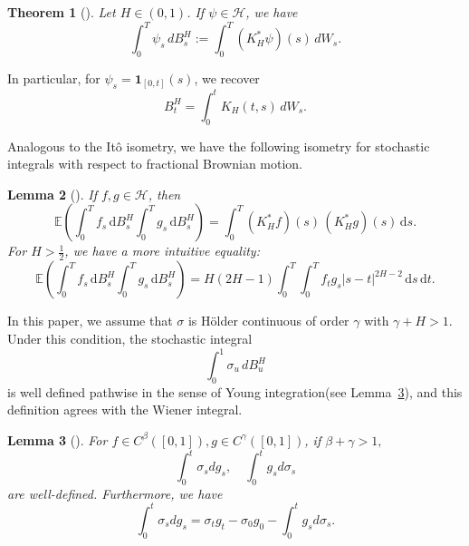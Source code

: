 \documentclass[preprint,12pt]{elsarticle}
\newtheorem{theorem}{Theorem}[section]
\newtheorem{lemma}[theorem]{Lemma}
\theoremstyle{definition}  %
\theoremstyle{plain}  %
\begin{document}
\begin{theorem}[\cite{Biagini2008}]
Let $H\in(0,1)$. 
If $\psi\in\mathcal{H}$, we have
\begin{equation*}
  \int_0^T \psi_s\,dB^H_s 
  := \int_0^T (K_H^*\psi)(s)\,dW_s.
\end{equation*}
\end{theorem}
In particular, for $\psi_s=\mathbf{1}_{[0,t]}(s)$, we recover
\begin{equation*}
  B^H_t=\int_0^t K_H(t,s)\,dW_s.
\end{equation*}


Analogous to the It\^o isometry, we have the following isometry for stochastic integrals with respect to fractional Brownian motion.
\begin{lemma}[\cite{Biagini2008}]\label{isometry}
If $f,g\in\mathcal{H}$, then
\begin{equation*}
  \mathbb{E}\!\left(\int_0^T f_s\,\mathrm{d}B^H_s \int_0^T g_s\,\mathrm{d}B^H_s\right)
  =\int_0^T (K_H^*f)(s)\,(K_H^*g)(s)\,\mathrm{d}s.
\end{equation*}
For $H > \tfrac{1}{2}$, we have a more intuitive equality:
\begin{equation}
    \mathbb{E}\!\left(\int_0^T f_s\,\mathrm{d}B^H_s \int_0^T g_s\,\mathrm{d}B^H_s\right)
    =H(2H-1)\int_0^T\int_0^T f_t g_s |s-t|^{2H-2}\,\mathrm{d}s\,\mathrm{d}t.
\end{equation}
\end{lemma}







	
	
	In this paper, we assume that $\sigma$ is H\"older continuous of order $\gamma$ with $\gamma+H>1$. Under this condition, the stochastic integral
\[
\int_0^1 \sigma_u \, dB^H_u
\]
is well defined pathwise in the sense of Young integration(see Lemma~\ref{young}), and this definition agrees with the Wiener integral.
 
	\begin{lemma}[\cite{Young1936}]   \label{young}
		For $f\in C^\beta([0,1]), g\in C^\gamma([0,1])$, if $\beta+\gamma>1,$ 
		\begin{equation*}
			\int_0^t \sigma_s dg_s,\quad \int_0^t g_sd\sigma_s 
		\end{equation*}
		are well-defined. Furthermore, we have
		\begin{equation*}
			\int_0^t \sigma_s dg_s=\sigma_t g_t-\sigma_0 g_0-\int_0^t g_sd\sigma_s.
		\end{equation*}
	\end{lemma}
	
\end{document}
